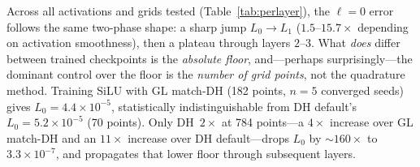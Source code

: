 \documentclass{article}
\begin{document}
Across all activations and grids tested
(Table~\ref{tab:perlayer}), the $\ell{=}0$ error follows the same
two-phase shape: a sharp jump $L_0 \to L_1$ ($1.5$--$15.7\times$
depending on activation smoothness), then a plateau through layers
$2$--$3$. What \emph{does} differ between trained checkpoints is the
\emph{absolute floor}, and---perhaps surprisingly---the dominant
control over the floor is the \emph{number of grid points}, not the
quadrature method. Training SiLU with GL match-DH (182 points,
$n=5$ converged seeds) gives $L_0 = 4.4 \times 10^{-5}$, statistically
indistinguishable from DH default's $L_0 = 5.2 \times 10^{-5}$ (70
points). Only DH~$2\times$ at 784 points---a $4\times$ increase
over GL match-DH and an $11\times$ increase over DH default---drops
$L_0$ by $\sim 160\times$ to $3.3 \times 10^{-7}$, and propagates
that lower floor through subsequent layers.
\end{document}
